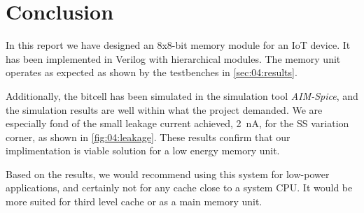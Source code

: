 \section{Conclusion}    \label{sec:06:conclusion}
In this report we have designed an 8x8-bit memory module for an IoT device. It has been implemented in Verilog with hierarchical modules. The memory unit operates as expected as shown by the testbenches in \autoref{sec:04:results}. 

Additionally, the bitcell has been simulated in the simulation tool \textit{AIM-Spice}, and the simulation results are well within what the project demanded. We are especially fond of the small leakage current achieved, \SI{2}{nA}, for the SS variation corner, as shown in \autoref{fig:04:leakage}. These results confirm that our implimentation is viable solution for a low energy memory unit.

Based on the results, we would recommend using this system for low-power applications, and certainly not for any cache close to a system CPU. It would be more suited for third level cache or as a main memory unit.

